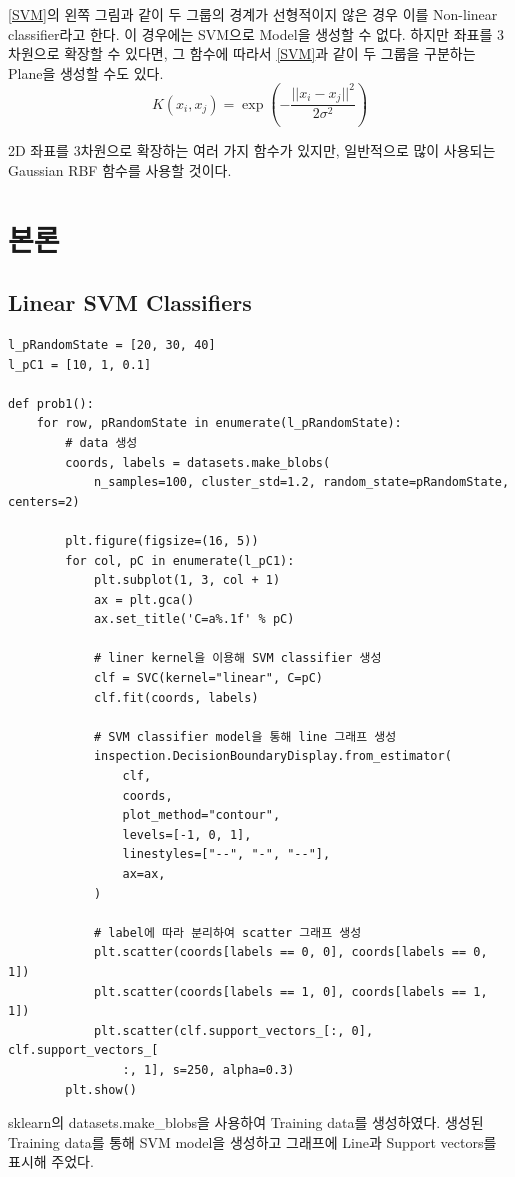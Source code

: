 \documentclass[]{report}
\begin{document}
\ref{SVM}의 왼쪽 그림과 같이 두 그룹의 경계가 선형적이지 않은 경우 이를 Non-linear classifier라고 한다. 
이 경우에는 SVM으로 Model을 생성할 수 없다. 하지만 좌표를 3차원으로 확장할 수 있다면, 
그 함수에 따라서 \ref{SVM}과 같이 두 그룹을 구분하는 Plane을 생성할 수도 있다.  \\

\[ K(x_i, x_j) = \exp(-\frac{||x_i - x_j||^2}{2\sigma^2})\]

2D 좌표를 3차원으로 확장하는 여러 가지 함수가 있지만, 일반적으로 많이 사용되는 Gaussian RBF 함수를 사용할 것이다. \\


\chapter{본론}

\section{Linear SVM Classifiers}

\begin{lstlisting}
l_pRandomState = [20, 30, 40]
l_pC1 = [10, 1, 0.1]

def prob1():
	for row, pRandomState in enumerate(l_pRandomState):
		# data 생성
		coords, labels = datasets.make_blobs(
			n_samples=100, cluster_std=1.2, random_state=pRandomState, centers=2)

		plt.figure(figsize=(16, 5))
		for col, pC in enumerate(l_pC1):
			plt.subplot(1, 3, col + 1)
			ax = plt.gca()
			ax.set_title('C=a%.1f' % pC)

			# liner kernel을 이용해 SVM classifier 생성
			clf = SVC(kernel="linear", C=pC)
			clf.fit(coords, labels)

			# SVM classifier model을 통해 line 그래프 생성
			inspection.DecisionBoundaryDisplay.from_estimator(
				clf,
				coords,
				plot_method="contour",
				levels=[-1, 0, 1],
				linestyles=["--", "-", "--"],
				ax=ax,
			)

			# label에 따라 분리하여 scatter 그래프 생성
			plt.scatter(coords[labels == 0, 0], coords[labels == 0, 1])
			plt.scatter(coords[labels == 1, 0], coords[labels == 1, 1])
			plt.scatter(clf.support_vectors_[:, 0], clf.support_vectors_[
				:, 1], s=250, alpha=0.3)
		plt.show()	
\end{lstlisting}

sklearn의 datasets.make\_blobs을 사용하여 Training data를 생성하였다. 
생성된 Training data를 통해 SVM model을 생성하고 그래프에 Line과 Support vectors를 표시해 주었다. 
\end{document}
